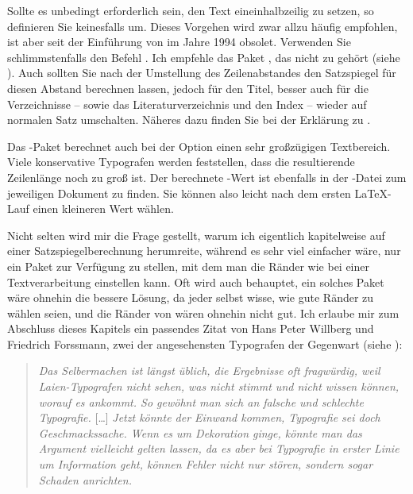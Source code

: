 Sollte es unbedingt erforderlich sein, den Text eineinhalbzeilig zu setzen, so
definieren Sie keinesfalls  um. Dieses Vorgehen wird
zwar allzu häufig empfohlen, ist aber seit der Einführung von {\LaTeXe} im
Jahre 1994 obsolet.  Verwenden Sie schlimmstenfalls den Befehl
. Ich empfehle das Paket
, das
nicht zu {\KOMAScript} gehört (siehe \cite{package:setspace}).  Auch sollten
Sie  nach der Umstellung des Zeilenabstandes den Satzspiegel
für diesen Abstand berechnen lassen, jedoch für den Titel, besser auch für die
Verzeichnisse -- sowie das Literaturverzeichnis und den Index -- wieder auf
normalen Satz umschalten. Näheres dazu finden Sie bei der Erklärung zu
%
.

Das -Paket berechnet auch bei der Option
%
 einen sehr großzügigen
Textbereich. Viele konservative Typografen werden feststellen, dass die
resultierende Zeilenlänge noch zu groß ist. Der berechnete -Wert ist
ebenfalls in der -Datei zum jeweiligen Dokument zu finden. Sie
können also leicht nach dem ersten \LaTeX-Lauf einen kleineren Wert wählen.

Nicht selten wird mir die Frage gestellt, warum ich
eigentlich kapitelweise auf einer Satzspiegelberechnung herumreite, während es
sehr viel einfacher wäre, nur ein Paket zur Verfügung zu stellen, mit dem man
die Ränder wie bei einer Textverarbeitung einstellen kann.  Oft wird auch
behauptet, ein solches Paket wäre ohnehin die bessere Lösung, da jeder selbst
wisse, wie gute Ränder zu wählen seien, und die Ränder von {\KOMAScript} wären
ohnehin nicht gut. Ich erlaube mir zum Abschluss dieses Kapitels ein passendes
Zitat von Hans Peter Willberg und Friedrich Forssmann, zwei der angesehensten
Typografen der Gegenwart (siehe \cite{TYPO:ErsteHilfe}):
\begin{quote}
  \label{sec:typearea.tips.cite}%
  \textit{Das Selbermachen ist längst üblich, die Ergebnisse
    oft fragwürdig, weil Laien-Typografen nicht sehen, was nicht stimmt und
    nicht wissen können, worauf es ankommt. So gewöhnt man sich an falsche und
    schlechte Typografie.} [\dots] \textit{Jetzt könnte der Einwand kommen,
    Typografie sei doch Geschmackssache. Wenn es um Dekoration ginge, könnte
    man das Argument vielleicht gelten lassen, da es aber bei Typografie in
    erster Linie um Information geht, können Fehler nicht nur stören, sondern
    sogar Schaden anrichten.}
\end{quote}
%
\EndIndexGroup

